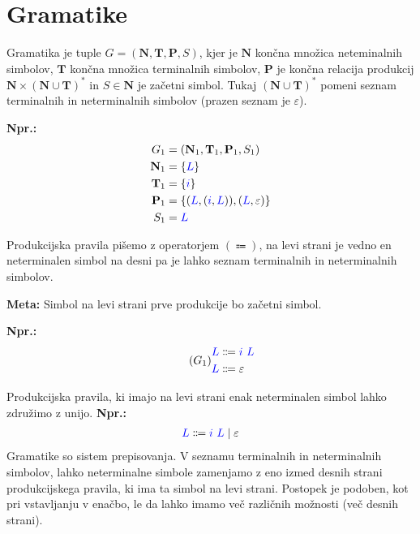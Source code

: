 \documentclass{article}
\newcommand{\Ex}{\textbf{Npr.:}\ }
\newcommand{\Special}[1]{\textbf{#1}}
\newcommand{\Set}[1]{\mathbf{#1}}
\newcommand{\Symbol}[1]{\textcolor{blue}{#1}}
\newcommand{\Grammar}{G}
\newcommand{\Terminals}{\Set{T}}
\newcommand{\NonTerminals}{\Set{N}}
\newcommand{\Productions}{\Set{P}}
\newcommand{\StartSymbol}{S}
\newcommand{\Null}{\varepsilon}
\newcommand{\Arrow}{\Coloneqq}
\newcommand{\Seq}{\ }
\newcommand{\Union}{\mathrel{|}}
\newcommand{\Kleene}[1]{#1^\ast}
\begin{document}

\section{Gramatike}
Gramatika je tuple $\Grammar = (\NonTerminals, \Terminals, \Productions, \StartSymbol)$, kjer je $\NonTerminals$ končna množica neteminalnih simbolov, $\Terminals$ končna množica terminalnih simbolov, $\Productions$ je končna relacija produkcij $\NonTerminals \times \Kleene{(\NonTerminals \cup \Terminals)}$ in $\StartSymbol \in \NonTerminals$ je začetni simbol.
Tukaj $\Kleene{(\NonTerminals \cup \Terminals)}$ pomeni seznam terminalnih in neterminalnih simbolov (prazen seznam je $\Null$).

\Ex
\begin{align*}
  \Grammar_1 &= (\NonTerminals_1, \Terminals_1, \Productions_1, \StartSymbol_1) \\
  \NonTerminals_1 &= \{\Symbol{L}\}\\
  \Terminals_1 &= \{\Symbol{i}\}\\
  \Productions_1 &= \{ (\Symbol{L}, (\Symbol{i}, \Symbol{L})), (\Symbol{L}, \Null) \}\\
  \StartSymbol_1 &= \Symbol{L}
\end{align*}

Produkcijska pravila pišemo z operatorjem $(\Arrow)$, na levi strani je vedno en neterminalen simbol na desni pa je lahko seznam terminalnih in neterminalnih simbolov.

\Special{Meta:} Simbol na levi strani prve produkcije bo začetni simbol.

\Ex
\begin{equation}
  \tag{$\Grammar_1$}
  \label{g:listi}
  \begin{aligned}
    \Symbol{L} &\Arrow \Symbol{i} \Seq \Symbol{L}\\
    \Symbol{L} &\Arrow \Null
  \end{aligned}
\end{equation}

Produkcijska pravila, ki imajo na levi strani enak neterminalen simbol lahko združimo z unijo.
\Ex
\begin{align*}
  \Symbol{L} &\Arrow \Symbol{i} \Seq \Symbol{L} \Union \Null\\
\end{align*}
Gramatike so sistem prepisovanja.
V seznamu terminalnih in neterminalnih simbolov, lahko neterminalne simbole zamenjamo z eno izmed desnih strani produkcijskega pravila, ki ima ta simbol na levi strani.
Postopek je podoben, kot pri vstavljanju v enačbo, le da lahko imamo več različnih možnosti (več desnih strani).
\end{document}
